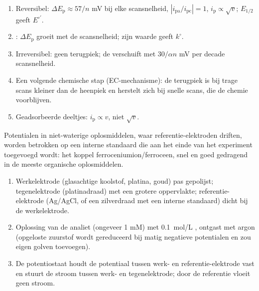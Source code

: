 \begin{method}\label{met:b3:electrode-kinetics:cv-diagnosis}
\begin{enumerate}
  \item Reversibel: $\Delta E_{\mathrm p} \approx 57/n$ mV bij elke scansnelheid, $|i_{\mathrm{pa}}/i_{\mathrm{pc}}| = 1$, $i_{\mathrm p} \propto \sqrt v$;
        $E_{1/2}$ geeft $E^{\circ\prime}$.
  \item {}: $\Delta E_{\mathrm p}$ groeit met de scansnelheid;
        zijn waarde geeft $k^\circ$.
  \item Irreversibel: geen terugpiek; de  verschuift met
        $30/\alpha n$ mV per decade scansnelheid.
  \item Een volgende chemische stap (EC-mechanisme): de terugpiek is bij
        trage scans kleiner dan de heenpiek en herstelt zich bij snelle
        scans, die de chemie voorblijven.
  \item Geadsorbeerde deeltjes: $i_{\mathrm p} \propto v$, niet $\sqrt v$.
\end{enumerate}
\end{method}

Potentialen in niet-waterige oplosmiddelen, waar referentie-elektroden
driften, worden betrokken op een interne standaard die aan het einde van
het experiment toegevoegd wordt: het koppel
ferroceniumion/ferroceen, snel en goed gedragend in de meeste organische
oplosmiddelen.

\begin{method}\label{met:b3:electrode-kinetics:three-electrode}
\begin{enumerate}
  \item Werkelektrode (glasachtige koolstof, platina, goud) pas gepolijst;
        tegenelektrode (platinadraad) met een grotere oppervlakte;
        referentie-elektrode (Ag/AgCl, of een zilverdraad met een interne
        standaard) dicht bij de werkelektrode.
  \item Oplossing van de analiet (ongeveer 1 mM) met \qty{0.1}{mol/L}
        , ontgast met argon (opgeloste zuurstof wordt gereduceerd
        bij matig negatieve potentialen en zou eigen golven toevoegen).
  \item De potentiostaat houdt de potentiaal tussen werk- en
        referentie-elektrode vast en stuurt de stroom tussen werk- en
        tegenelektrode; door de referentie vloeit geen stroom.
\end{enumerate}
\end{method}

